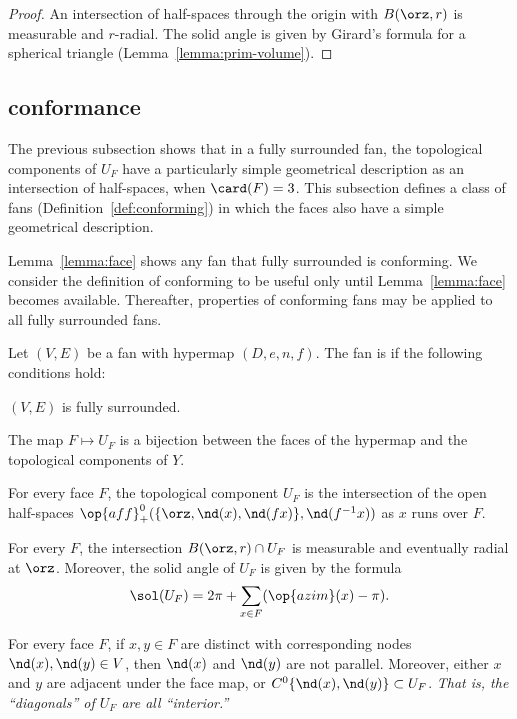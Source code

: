 \begin{proof} An intersection of half-spaces through the origin 
with $B(\orz,r)$ is measurable and
$r$-radial.  The solid angle is given by Girard's formula for
a spherical triangle (Lemma~\ref{lemma:prim-volume}).
\end{proof}
%

\subsection{conformance}\label{sec:conformance}


The previous subsection shows that in a fully surrounded fan, the topological
components of $U_F$ have a particularly simple geometrical description as
an intersection of half-spaces, when $\card(F)=3$.  This subsection defines
a class of fans (Definition~\ref{def:conforming}) in which the faces also have
a  simple geometrical description.

Lemma~\ref{lemma:face} shows any fan that fully surrounded is
conforming.  We consider the definition of conforming to be
useful only until Lemma~\ref{lemma:face} becomes available.
Thereafter, properties of conforming fans may be applied to all fully
surrounded fans.

\begin{definition}[conforming]\label{def:conforming}
Let $(V,E)$ be a fan with hypermap $(D,e,n,f)$.  The fan is
 if the following conditions hold:
\begin{nomerate}
\item {} $(V,E)$ is fully surrounded.
\item {} The map $F\mapsto U_F$ is a bijection between
the faces of the hypermap and the topological components of $Y$.
\item {} For every face $F$, the topological component
$U_F$ is the intersection of the open half-spaces
$\op{aff}_+^0(\{\orz,\nd(x),\nd({f x})\},\nd(f^{-1} x))$ as $x$ runs over
$F$.
\item {} For every $F$, the intersection
$B(\orz,r)\cap U_F$ is measurable and eventually radial at $\orz$.
Moreover, the solid angle of $U_F$ is given by the formula
\begin{displaymath}
\sol(U_F) = 2\pi + \sum_{x\in F}(\op{azim}(x)-\pi).
\end{displaymath}
\item {} For every face $F$, if $x,y\in F$ are distinct
with corresponding nodes $\nd(x),\nd(y)\in V$, then $\nd(x)$ and
$\nd(y)$ are not parallel.  Moreover, either $x$ and $y$ are adjacent under
the face map, or $C^0\{\nd(x),\nd(y)\}\subset U_F$.  {\it That is, the
``diagonals'' of $U_F$ are all ``interior.''}
\end{nomerate}
\end{definition}


